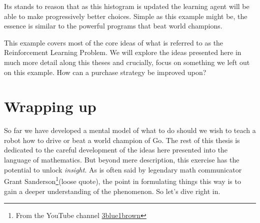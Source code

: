 Its stands to reason that as this histogram is updated the 
learning agent will be able to make progressively better 
choices. Simple as this example might be, the essence is 
similar to the powerful programs that beat world champions.

This example covers most of the core ideas of what is referred 
to as the Reinforcement Learning Problem. We will explore the 
ideas presented here in much more detail along this theses and 
crucially, focus on something we left out on this example. How 
can a purchase strategy be improved upon?

\section{Wrapping up}
So far we have developed a mental model of what to do should we 
wish to teach a robot how to drive or beat a world champion of 
Go. The rest of this thesis is dedicated to the careful 
development of the ideas here presented into the language of 
mathematics.  But beyond mere description, this exercise has 
the potential to unlock \textit{insight}. As is often said by 
legendary math communicator Grant Sanderson\footnote{From the 
YouTube channel 
\href{https://www.youtube.com/channel/UCYO_jab_esuFRV4b17AJtAw}{3blue1brown}}(loose 
quote), the point in formulating things this way is to gain a 
deeper understanding of the phenomenon. So let's dive right in.
